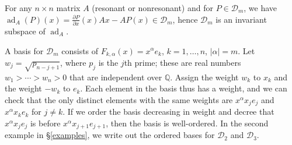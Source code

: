 \documentclass{article}
\newcommand{\ad}{\operatorname{ad}}
\begin{document}
For any $n \times n$ matrix $A$ (resonant or nonresonant) and for $P \in \mathscr{D}_m$, we have $\ad_A(P)(x)=\frac{\partial P}{\partial x}(x) Ax-AP(x) \in \mathscr{D}_m$, hence $\mathscr{D}_m$ is an invariant subspace
of $\ad_A$.

A basis for $\mathscr{D}_m$ consists of $F_{k,\alpha}(x)=x^\alpha e_k$, $k=1,\ldots,n$, $|\alpha|=m$.
Let $w_j=\sqrt{p_{n-j+1}}$, where $p_j$ is the $j$th prime; these are real numbers $w_1>\cdots>w_n>0$ that are independent over $\mathbb{Q}$. Assign the weight $w_k$ to $x_k$ and the weight $-w_k$ to $e_k$. Each element in the basis thus has a weight, and we can check that the only distinct elements with the same weights are $x^\alpha x_j e_j$ and $x^\alpha x_k e_k$ for $j \neq k$. If we order the basis decreasing in weight and decree that $x^\alpha x_j e_j$ is
before $x^\alpha x_{j+1} e_{j+1}$, then the basis is well-ordered. In the second example in \S \ref{examples}, we write out the ordered bases for
$\mathscr{D}_2$ and $\mathscr{D}_3$.
\end{document}
